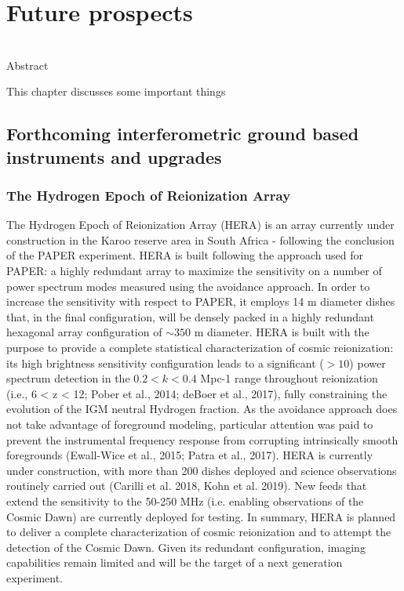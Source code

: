 \chapter{Future prospects}

\begin{bf}
  \author{Author Name}\\
  
Abstract\\
\end{bf}

This chapter discusses some important things

\section{Forthcoming interferometric ground based instruments and upgrades}

\subsection{The Hydrogen Epoch of Reionization Array}
The Hydrogen Epoch of Reionization Array (HERA) is an array currently under construction in the Karoo reserve area in South Africa - following the conclusion of the PAPER experiment. HERA is built following the approach used for PAPER: a highly redundant array to maximize the sensitivity on a number of power spectrum modes measured using the avoidance approach. In order to increase the sensitivity with respect to PAPER, it employs 14 m diameter dishes that, in the final configuration, will be densely packed in a highly redundant hexagonal array configuration of $\sim 350$ m diameter. 
HERA is built with the purpose to provide a complete statistical characterization of cosmic reionization: its high brightness sensitivity configuration leads to a significant ($> 10$) power spectrum detection in the $0.2 < k < 0.4$ Mpc-1 range throughout reionization (i.e., 6 < z < 12; Pober et al., 2014; deBoer et al., 2017), fully constraining the evolution of the IGM neutral Hydrogen fraction. As the avoidance approach does not take advantage of foreground modeling, particular attention was paid to prevent the instrumental frequency response from corrupting intrinsically smooth foregrounds (Ewall-Wice et al., 2015; Patra et al., 2017).
HERA is currently under construction, with more than 200 dishes deployed and science observations routinely carried out (Carilli et al. 2018, Kohn et al. 2019). New feeds that extend the sensitivity to the 50-250 MHz (i.e. enabling observations of the Cosmic Dawn) are currently deployed for testing.
In summary, HERA is planned to deliver a complete characterization of cosmic reionization and to attempt the detection of the Cosmic Dawn. Given its redundant configuration, imaging capabilities remain limited and will be the target of a next generation experiment.


